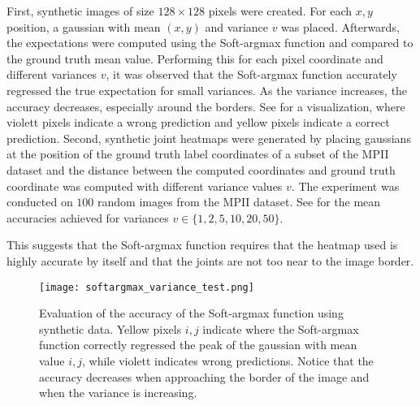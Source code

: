First, synthetic images of size $128 \times 128$ pixels were created.
For each $x,y$ position, a gaussian with mean $(x,y)$ and variance $v$ was placed.
Afterwards, the expectations were computed using the Soft-argmax function and compared to the ground truth mean value.
Performing this for each pixel coordinate and different variances $v$, it was observed that the Soft-argmax function accurately regressed the true expectation for small variances.
As the variance increases, the accuracy decreases, especially around the borders.
See  for a visualization, where violett pixels indicate a wrong prediction and yellow pixels indicate a correct prediction.
Second, synthetic joint heatmaps were generated by placing gaussians at the position of the ground truth label coordinates of a subset of the MPII dataset and the distance between the computed coordinates and ground truth coordinate was computed with different variance values $v$.
The experiment was conducted on $100$ random images from the MPII dataset.
See  for the mean accuracies achieved for variances $v \in \{1, 2, 5, 10, 20, 50 \}$.

\begin{table}[]
    \centering
    \caption{Mean average accuracy of Soft-argmax when detecting ground truth coordinates from synthetic joint heatmaps.} %
    \label{tab:softargmax_numeric_eval}
\end{table}

This suggests that the Soft-argmax function requires that the heatmap used is highly accurate by itself and that the joints are not too near to the image border.

\begin{figure}[htb!]
    \centering
    \texttt{[image: softargmax\_variance\_test.png]}
    \caption{Evaluation of the accuracy of the Soft-argmax function using synthetic data. Yellow pixels $i,j$ indicate where the Soft-argmax function correctly regressed the peak of the gaussian with mean value $i,j$, while violett indicates wrong predictions. Notice that the accuracy decreases when approaching the border of the image and when the variance is increasing. }
    \label{fig:softargmax_variance_test}
\end{figure}

